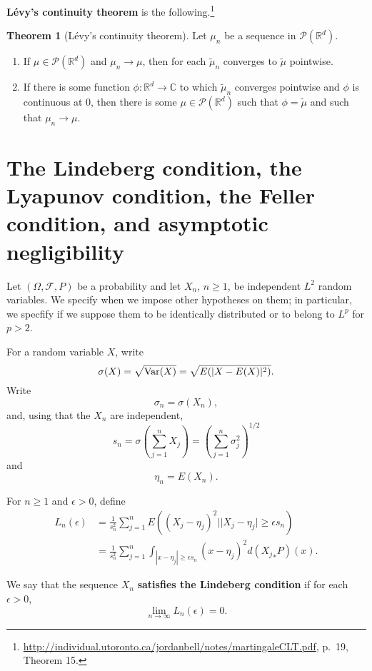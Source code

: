 \documentclass{article}
\newcommand{\Var}{\ensuremath\mathrm{Var}}
\theoremstyle{definition}
\newtheorem{theorem}{Theorem}
\theoremstyle{definition}
\begin{document}
\textbf{L\'evy's continuity theorem} is the following.\footnote{\url{http://individual.utoronto.ca/jordanbell/notes/martingaleCLT.pdf},
p.~19, Theorem 15.}

\begin{theorem}[L\'evy's continuity theorem]
Let $\mu_n$ be a sequence in $\mathscr{P}(\mathbb{R}^d)$.
\begin{enumerate}
\item If $\mu \in \mathscr{P}(\mathbb{R}^d)$ and $\mu_n \to \mu$, then for each $\tilde{\mu}_n$ converges to
$\tilde{\mu}$ pointwise.
\item If there is some function $\phi:\mathbb{R}^d \to \mathbb{C}$ to which $\tilde{\mu}_n$ converges pointwise
and $\phi$ is continuous at $0$, then there is some $\mu \in \mathscr{P}(\mathbb{R}^d)$ such that
$\phi=\tilde{\mu}$ and such that $\mu_n \to \mu$. 
\end{enumerate}
\label{levy}
\end{theorem}




\section{The Lindeberg condition, the Lyapunov condition, the Feller condition, and asymptotic negligibility}
Let $(\Omega,\mathscr{F},P)$ be a probability and let
$X_n$, $n \geq 1$, be independent $L^2$ random variables. We specify when we impose other hypotheses on them; in particular,
we specfify if we suppose them to be identically distributed or to belong to $L^p$ for $p>2$. 


For a random variable $X$, write
\[
\sigma(X) = \sqrt{\Var(X)} = \sqrt{E(|X-E(X)|^2)}.
\]
Write
\[
\sigma_n = \sigma(X_n),
\]
and, using that the $X_n$ are independent,
\[
s_n = \sigma\left( \sum_{j=1}^n X_j \right) = \left( \sum_{j=1}^n \sigma_j^2 \right)^{1/2}
\]
and
\[
\eta_n=E(X_n).
\]

For $n \geq 1$ and $\epsilon>0$, define
\begin{align*}
L_n(\epsilon)& = \frac{1}{s_n^2} \sum_{j=1}^n E((X_j-\eta_j)^2 | |X_j-\eta_j| \geq \epsilon s_n)\\
&=\frac{1}{s_n^2} \sum_{j=1}^n \int_{|x-\eta_j| \geq \epsilon s_n} (x-\eta_j)^2 d({X_j}_*P)(x).
\end{align*}

We say that the sequence  $X_n$ \textbf{satisfies the Lindeberg condition} if
for each $\epsilon>0$,
\[
\lim_{n \to \infty} L_n(\epsilon) = 0.
\]
\end{document}
